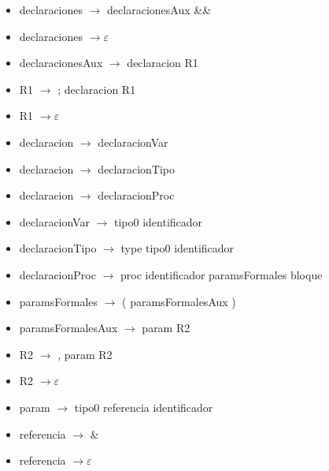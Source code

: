 \documentclass[11pt]{article}
\begin{document}
        \begin{itemize}
            \item declaraciones $\rightarrow$ declaracionesAux \&\&
            \item declaraciones $\rightarrow \varepsilon$
            \item declaracionesAux $\rightarrow$ declaracion R1
            \item R1 $\rightarrow$ ; declaracion R1
            \item R1 $\rightarrow \varepsilon$
            \item declaracion $\rightarrow$ declaracionVar
            \item declaracion $\rightarrow$ declaracionTipo
            \item declaracion $\rightarrow$ declaracionProc
            \item declaracionVar $\rightarrow$ tipo0 identificador
            \item declaracionTipo $\rightarrow$ type tipo0 identificador
            \item declaracionProc $\rightarrow$ proc identificador paramsFormales bloque
            \item paramsFormales $\rightarrow$ ( paramsFormalesAux )
            \item paramsFormalesAux $\rightarrow$ param R2
            \item R2 $\rightarrow$ , param R2
            \item R2 $\rightarrow \varepsilon$
            \item param $\rightarrow$ tipo0 referencia identificador
            \item referencia $\rightarrow$ \&
            \item referencia $\rightarrow \varepsilon$
        \end{itemize}
        \
\end{document}

